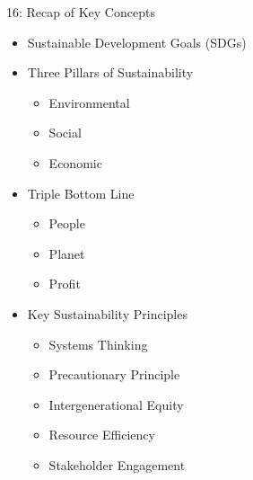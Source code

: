 \documentclass[
  ignorenonframetext,
]{beamer}
\providecommand{\tightlist}{%
  \setlength{\itemsep}{0pt}\setlength{\parskip}{0pt}}\usepackage{longtable,booktabs,array}
\begin{document}
\begin{frame}{16: Recap of Key Concepts}
\label{recap-of-key-concepts}
\begin{itemize}
\tightlist
\item
  Sustainable Development Goals (SDGs)
\item
  Three Pillars of Sustainability

  \begin{itemize}
  \tightlist
  \item
    Environmental
  \item
    Social
  \item
    Economic
  \end{itemize}
\item
  Triple Bottom Line

  \begin{itemize}
  \tightlist
  \item
    People
  \item
    Planet
  \item
    Profit
  \end{itemize}
\item
  Key Sustainability Principles

  \begin{itemize}
  \tightlist
  \item
    Systems Thinking
  \item
    Precautionary Principle
  \item
    Intergenerational Equity
  \item
    Resource Efficiency
  \item
    Stakeholder Engagement
  \end{itemize}
\end{itemize}
\end{frame}
\end{document}
